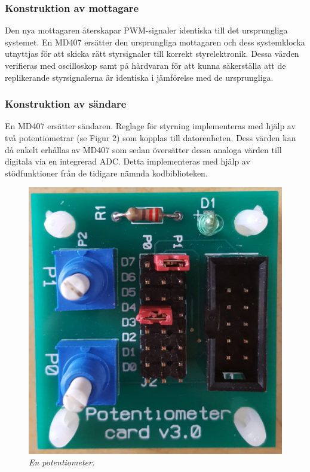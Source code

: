 \documentclass[a4paper]{article}
\begin{document}
\subsubsection{Konstruktion av mottagare}
Den nya mottagaren återskapar PWM-signaler identiska till det ursprungliga systemet. En MD407 ersätter den ursprungliga mottagaren och dess systemklocka utnyttjas för att skicka rätt styrsignaler till korrekt styrelektronik. Dessa värden verifieras med oscilloskop samt på hårdvaran för att kunna säkerställa att de replikerande styrsignalerna är identiska i jämförelse med de ursprungliga. 





\subsubsection{Konstruktion av sändare}
En MD407 ersätter sändaren. Reglage för styrning implementeras med hjälp av två potentiometrar (se Figur 2) som kopplas till datorenheten. Dess värden kan då enkelt erhållas av MD407 som sedan översätter dessa analoga värden till digitala via en integrerad ADC. Detta implementeras med hjälp av stödfunktioner från de tidigare nämnda kodbiblioteken.

\begin{figure}[H]
\includegraphics[scale=0.04]{Potentiometer.jpg}
\centering
\caption{\it En potentiometer.}
\end{figure} 
\end{document}
